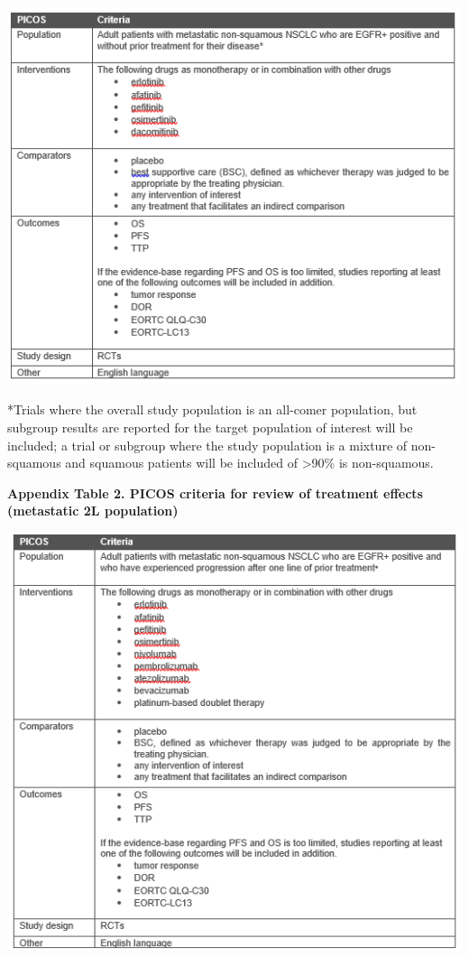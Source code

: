 \documentclass[11pt,final,fleqn]{article}\usepackage[]{graphicx}\usepackage[]{color}
\theoremstyle{plain}
\begin{document}
{\begin{appendices}
\includegraphics[scale=1]{tables/picos-metastatic-1L.png} 

*Trials where the overall study population is an all-comer population, but subgroup results are reported for the target population of interest will be included; a trial or subgroup where the study population is a mixture of non-squamous and squamous  patients will be included of >90\% is non-squamous.

\textbf{Appendix Table 2. PICOS criteria for review of treatment effects (metastatic 2L population)}

\includegraphics[scale=1]{tables/picos-metastatic-2L.png} 


\end{appendices}}
\end{document}
